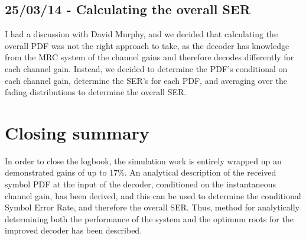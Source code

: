 \subsection{25/03/14 - Calculating the overall SER}

I had a discussion with David Murphy, and we decided that calculating the overall PDF was not the right approach to take, as the decoder has knowledge from the MRC system of the channel gains and therefore decodes differently for each channel gain. Instead, we decided to determine the PDF's conditional on each channel gain, determine the SER's for each PDF, and averaging over the fading distributions to determine the overall SER.

\section{Closing summary}

In order to close the logbook, the simulation work is entirely wrapped up an demonstrated gains of up to 17\%. An analytical description of the received symbol PDF at the input of the decoder, conditioned on the instantaneous channel gain, has been derived, and this can be used to determine the conditional Symbol Error Rate, and therefore the overall SER. Thus, method for analytically determining both the performance of the system and the optimum roots for the improved decoder has been described.










